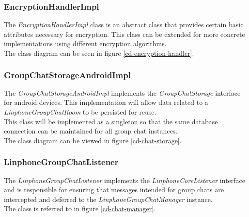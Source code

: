 \documentclass[11pt]{article}
\begin{document}
\subsubsection{EncryptionHandlerImpl}
The \textit{EncryptionHandlerImpl} class is an abstract class that provides certain basic attributes necessary for encryption. This class can be extended for more concrete implementations using different encryption algorithms.\\
The class diagram can be seen in figure \ref{cd-encryption-handler}.
\subsubsection{GroupChatStorageAndroidImpl}
The \textit{GroupChatStorageAndroidImpl} implements the \textit{GroupChatStorage} interface for android devices. This implementation will allow data related to a \textit{LinphoneGroupChatRoom} to be persisted for reuse.\\
This class will be implemented as a singleton so that the same database connection can be maintained for all group chat instances.\\
The class diagram can be viewed in figure \ref{cd-chat-storage}.\\
\subsubsection{LinphoneGroupChatListener}
The \textit{LinphoneGroupChatListener} implements the \textit{LinphoneCoreListener} interface and is responsible for ensuring that messages intended for group chats are intercepted and deferred to the \textit{LinphoneGroupChatManager} instance. \\
The class is referred to in figure \ref{cd-chat-manager}.
\end{document}
